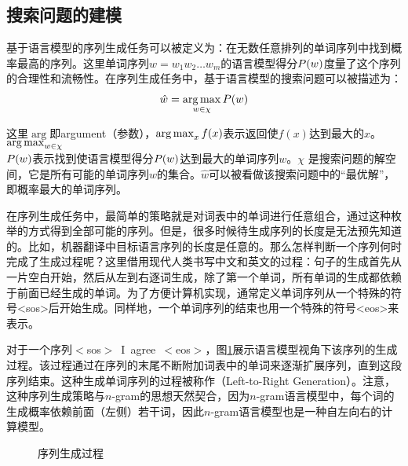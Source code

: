 
\subsection{搜索问题的建模}

\parinterval 基于语言模型的序列生成任务可以被定义为：在无数任意排列的单词序列中找到概率最高的序列。这里单词序列$w = w_1 w_2 \ldots w_m$的语言模型得分${P}(w)$度量了这个序列的合理性和流畅性。在序列生成任务中，基于语言模型的搜索问题可以被描述为：
\begin{eqnarray}
\hat{w} = \operatorname*{arg\,max}_{w \in \chi}{P}(w)
\label{eq:2-42}
\end{eqnarray}

\noindent 这里$\arg$即argument（参数），$\operatorname*{arg\,max}_x f(x)$表示返回使$f(x)$达到最大的$x$。$\operatorname*{arg\,max}_{w \in \chi}$\\${P}(w)$表示找到使语言模型得分${P}(w)$达到最大的单词序列$w$。$\chi$ 是搜索问题的解空间，它是所有可能的单词序列$w$的集合。$\hat{w}$可以被看做该搜索问题中的“最优解”，即概率最大的单词序列。

\parinterval 在序列生成任务中，最简单的策略就是对词表中的单词进行任意组合，通过这种枚举的方式得到全部可能的序列。但是，很多时候待生成序列的长度是无法预先知道的。比如，机器翻译中目标语言序列的长度是任意的。那么怎样判断一个序列何时完成了生成过程呢？这里借用现代人类书写中文和英文的过程：句子的生成首先从一片空白开始，然后从左到右逐词生成，除了第一个单词，所有单词的生成都依赖于前面已经生成的单词。为了方便计算机实现，通常定义单词序列从一个特殊的符号<sos>后开始生成。同样地，一个单词序列的结束也用一个特殊的符号<eos>来表示。

\parinterval 对于一个序列$<$sos$>$\ I\ agree\ $<$eos$>$，图\ref{fig:2-12}展示语言模型视角下该序列的生成过程。该过程通过在序列的末尾不断附加词表中的单词来逐渐扩展序列，直到这段序列结束。这种生成单词序列的过程被称作{\small{}}（Left-to-Right Generation）。注意，这种序列生成策略与$n$-gram的思想天然契合，因为$n$-gram语言模型中，每个词的生成概率依赖前面（左侧）若干词，因此$n$-gram语言模型也是一种自左向右的计算模型。

\begin{figure}[htp]
    \centering
 	
	\caption{序列生成过程}
    \label{fig:2-12}
\end{figure}

